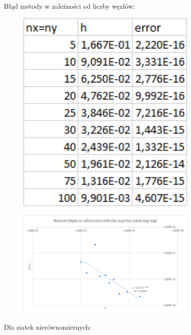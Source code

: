 Błąd metody w zależności od liczby węzłów:

\begin{figure}[!ht]
	\begin{center}
		\includegraphics[width=0.8\textwidth]{Lab5/charts/zad1/error_dane.png}
	\end{center}
\end{figure}

\begin{figure}[!ht]
	\begin{center}
		\includegraphics[width=0.8\textwidth]{Lab5/charts/zad1/error.png}
	\end{center}
\end{figure}

\newpage

Dla siatek nierównomiernych:

